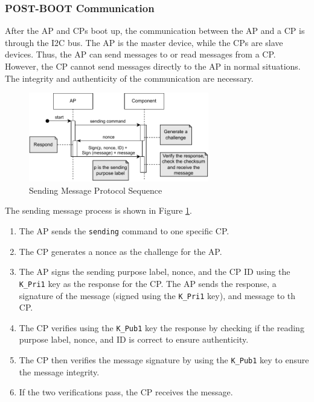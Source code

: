 \documentclass[11pt,oneside,onecolumn,letterpaper]{article}
\begin{document}
	\subsubsection{POST-BOOT Communication}
	After the AP and CPs boot up,
	the communication between the AP and a CP is through the I2C bus.
	The AP is the master device,
	while the CPs are slave devices.
	Thus,
	the AP can send messages to or read messages from a CP.
	However, the CP cannot send messages directly to the AP in normal situations.
	The integrity and authenticity of the communication are necessary.
	
	\begin{figure}[h]
		\centering
		\includegraphics[width=0.7\textwidth]{pics/post1.pdf}
		\caption{Sending Message Protocol Sequence}
		\label{fig:functionality_post1}
	\end{figure}
	
	The sending message process is shown in Figure \ref{fig:functionality_post1}.
	\begin{enumerate}
		\item The AP sends the \texttt{sending} command to one specific CP.
		\item The CP generates a nonce as the challenge for the AP.
		\item The AP signs the sending purpose label,
		nonce,
		and the CP ID using the \texttt{K\_Pri1} key as the response for the CP.
		The AP sends the response,
		a signature of the message (signed using the \texttt{K\_Pri1} key),
		and message to th CP.
		\item The CP verifies using the \texttt{K\_Pub1} key the response by checking if the reading purpose label,
		nonce,
		and ID is correct to ensure authenticity.
		\item The CP then verifies the message signature by using the \texttt{K\_Pub1} key to ensure the message integrity.
		\item If the two verifications pass,
		the CP receives the message.
	\end{enumerate}
	
\end{document}
